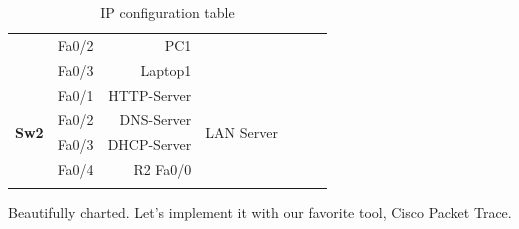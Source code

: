 \documentclass[11pt,a4paper]{report}
\begin{document}
\begin{longtable}[c]{@{}llrllrr@{}}
                                                               & Fa0/2                        & PC1                       &                                                       & \multicolumn{3}{c}{}                                                                                                                                                 \\
                                                               & Fa0/3                        & Laptop1                   &                                                       & \multicolumn{3}{c}{}                                                                                                                                                 \\* \midrule
            \multirow{4}{*}{\textbf{Sw2}}                      & Fa0/1                        & HTTP-Server               & \multirow{4}{*}{LAN Server}                           & \multicolumn{3}{c}{\multirow{4}{*}{}}                                                                                                                                \\
                                                               & Fa0/2                        & DNS-Server                &                                                       & \multicolumn{3}{c}{}                                                                                                                                                 \\
                                                               & Fa0/3                        & DHCP-Server               &                                                       & \multicolumn{3}{c}{}                                                                                                                                                 \\
                                                               & Fa0/4                        & R2 Fa0/0                  &                                                       & \multicolumn{3}{c}{}                                                                                                                                                 \\* \bottomrule
            \caption{IP configuration table}
            \label{tab:ipconftable}\\
        \end{longtable}

        Beautifully charted. Let's implement it with our favorite tool, Cisco Packet Trace.\\
\end{document}
